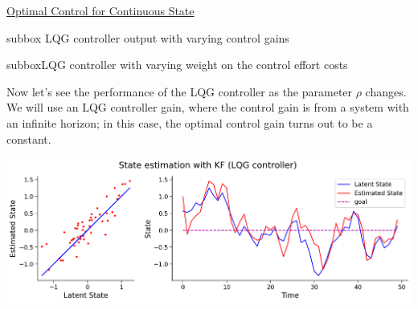 \begin{textbox}{\href{https://compneuro.neuromatch.io/tutorials/W3D3_OptimalControl/student/W3D3_Tutorial2.html}{Optimal Control for Continuous State}}
\begin{subbox}{subbox}{  LQG controller output with varying control gains}
\end{subbox}

\begin{subbox}{subbox}{LQG controller with varying weight on the control effort costs}
\scriptsize

Now let's see the performance of the LQG controller as the parameter $\rho$ changes. We will use an LQG controller gain, where the control gain is from a system with an infinite horizon; in this case, the optimal control gain turns out to be a constant.


\begin{center}
    
\includegraphics[scale=0.2]{Figures/OC/OC_Figure14.png}
\end{center}


\end{subbox}

\end{textbox}
